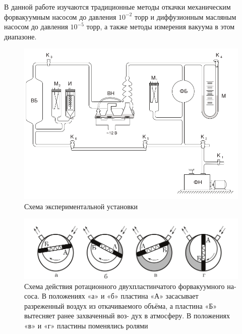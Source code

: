 \documentclass[11pt,a4paper]{article}
\begin{document}
В данной работе изучаются традиционные методы откачки 
механическим форвакуумным насосом до давления 
$10^{-2}$ торр и диффузионным
масляным насосом до давления $10^{-5}$ торр, а также методы измерения
вакуума в этом диапазоне.
\begin{figure}[h!]
  \includegraphics*[width=\textwidth]{ust.png}
  \caption{Схема экспериментальной установки}
  \label{fig:ust}
\end{figure}
\begin{figure}[h!]
  \includegraphics*[width=\textwidth]{ust2.png}
  \caption{Схема действия ротационного двухпластинчатого форвакуумного на-
  соса. В положениях «а» и «б» пластина «А» засасывает разреженный воздух
  из откачиваемого объёма, а пластина «Б» вытесняет ранее захваченный воз-
  дух в атмосферу. В положениях «в» и «г» пластины поменялись ролями}
  \label{fig:ust2}
\end{figure}
\end{document}
